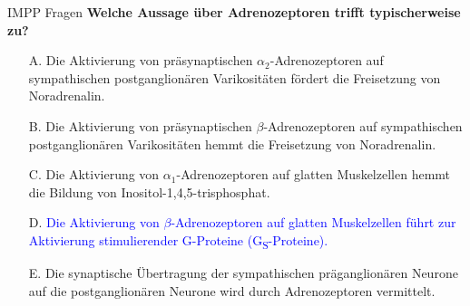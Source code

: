 \documentclass{beamer}
\begin{document}
\begin{frame}{IMPP Fragen}
\textbf{Welche Aussage über Adrenozeptoren trifft typischerweise zu?} \\[0.2 cm]

\begin{itemize}
\item[A.] Die Aktivierung von präsynaptischen \(\alpha_2\)-Adrenozeptoren auf sympathischen postganglionären Varikositäten fördert die Freisetzung von Noradrenalin. 
\item[B.] Die Aktivierung von präsynaptischen \(\beta\)-Adrenozeptoren auf sympathischen  postganglionären Varikositäten hemmt die Freisetzung von Noradrenalin. 
\item[C.] Die Aktivierung von \(\alpha_1\)-Adrenozeptoren auf glatten Muskelzellen hemmt die Bildung von Inositol-1,4,5-trisphosphat.
\item[D.] \textcolor{blue}{Die Aktivierung von \(\beta\)-Adrenozeptoren auf glatten Muskelzellen führt zur Aktivierung stimulierender G-Proteine (G\textsubscript{S}-Proteine).}
\item[E.] Die synaptische Übertragung der sympathischen präganglionären Neurone auf die postganglionären Neurone wird durch Adrenozeptoren vermittelt. 

\end{itemize}
\end{frame}








\end{document}
